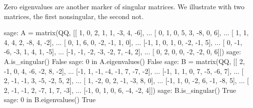Zero eigenvalues are another marker of singular matrices.  We illustrate with two matrices, the first nonsingular, the second not.
%
\begin{sageexample}
sage: A = matrix(QQ, [[ 1,  0,  2,  1,  1, -3,  4, -6],
...                   [ 0,  1,  0,  5,  3, -8,  0,  6],
...                   [ 1,  1,  4,  4,  2, -8,  4, -2],
...                   [ 0,  1,  6,  0, -2, -1,  1,  0],
...                   [-1,  1,  0,  1,  0, -2, -1,  5],
...                   [ 0, -1, -6, -3,  1,  4,  1, -5],
...                   [-1, -1, -2, -3, -2,  7, -4,  2],
...                   [ 0,  2,  0,  0, -2, -2,  0,  6]])
sage: A.is_singular()
False
sage: 0 in A.eigenvalues()
False
sage: B = matrix(QQ, [[ 2, -1,  0,  4, -6, -2,  8, -2],
...                   [-1,  1, -1, -4, -1,  7, -7, -2],
...                   [-1,  1,  1,  0,  7, -5, -6,  7],
...                   [ 2, -1, -1,  3, -5, -2,  5,  2],
...                   [ 1, -2,  0,  2, -1, -3,  8,  0],
...                   [-1,  1,  0, -2,  6, -1, -8,  5],
...                   [ 2, -1, -1,  2, -7,  1,  7, -3],
...                   [-1,  0,  1,  0,  6, -4, -2,  4]])
sage: B.is_singular()
True
sage: 0 in B.eigenvalues()
True
\end{sageexample}
%
\begin{sageverbatim}
\end{sageverbatim}
%
